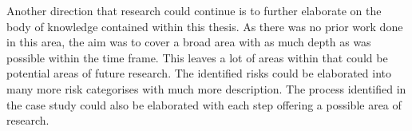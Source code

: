 Another direction that research could continue is to further elaborate on the body of knowledge contained within this thesis. As there was no prior work done in this area, the aim was to cover a broad area with as much depth as was possible within the time frame. This leaves a lot of areas within that could  be potential areas of future research. The identified risks could be elaborated into many more risk categorises with much more description. The process identified in the case study could also be elaborated with each step offering a possible area of research.
